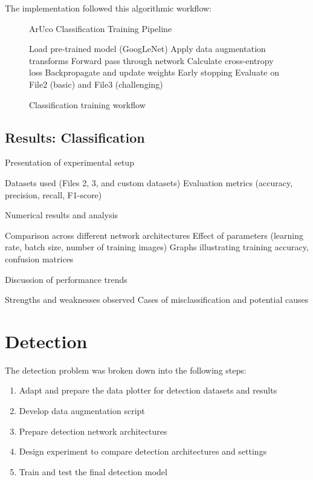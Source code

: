 \documentclass[conference]{IEEEtran}
\begin{document}
The implementation followed this algorithmic workflow:

\begin{figure}[H]
\begin{algorithm}[H]
\caption{ArUco Classification Training Pipeline}
\begin{algorithmic}[1]
\STATE Load pre-trained model (GoogLeNet)
\STATE Apply data augmentation transforms
    \STATE Forward pass through network
    \STATE Calculate cross-entropy loss
    \STATE Backpropagate and update weights
        \STATE Early stopping
    \ENDIF
\ENDFOR
\STATE Evaluate on File2 (basic) and File3 (challenging)
\end{algorithmic}
\end{algorithm}
\caption{Classification training workflow}
\end{figure}

\subsection{Results: Classification}

Presentation of experimental setup

Datasets used (Files 2, 3, and custom datasets)
Evaluation metrics (accuracy, precision, recall, F1-score)

Numerical results and analysis

Comparison across different network architectures
Effect of parameters (learning rate, batch size, number of training images)
Graphs illustrating training accuracy, confusion matrices

Discussion of performance trends

Strengths and weaknesses observed
Cases of misclassification and potential causes

\section{Detection}

The detection problem was broken down into the following steps:

\begin{enumerate}
  \item Adapt and prepare the data plotter for detection datasets and results
  \item Develop data augmentation script
  \item Prepare detection network architectures
  \item Design experiment to compare detection architectures and settings
  \item Train and test the final detection model
\end{enumerate}
\end{document}
